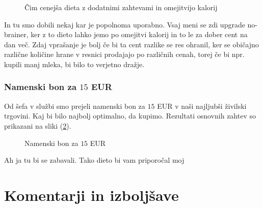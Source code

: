 \documentclass[a4paper]{article}
\begin{document}
\begin{figure}
    \centering
    \caption{Čim cenejša dieta z dodatnimi zahtevami in omejitvijo kalorij}
    \label{fig:eur-add-cal}
\end{figure}

In tu smo dobili nekaj kar je popolnoma uporabno. Vsaj meni se zdi upgrade no-brainer, ker 
z to dieto lahko jemo po omejitvi kalorij in to le za dober cent na dan več. Zdaj vprašanje je bolj 
če bi ta cent razlike se res ohranil, ker se običajno različne količine hrane v resnici
prodajajo po različnih cenah, torej če bi npr. kupili manj mleka, bi bilo to verjetno dražje. 

\subsubsection{Namenski bon za $15$ EUR}
Od šefa v službi smo prejeli namenski bon za $15$ EUR v naši najljubši živilski trgovini. Kaj 
bi bilo najbolj optimalno, da kupimo. Rezultati osnovnih zahtev so prikazani na sliki 
(\ref{fig:eur-budget}).

\begin{figure}
    \centering
    \caption{Namenski bon za $15$ EUR}
    \label{fig:eur-budget}
\end{figure}

Ah ja tu bi se zabavali. Tako dieto bi vam priporočal moj



\section{Komentarji in izboljšave}

\newpage


\end{document}
